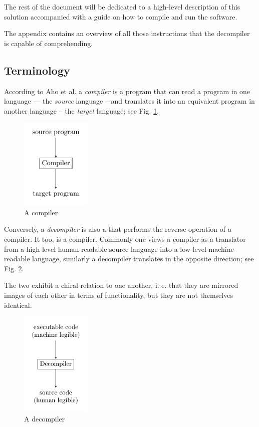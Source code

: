 \documentclass[a4paper]{article}
\begin{document}
The rest of the document will be dedicated to a high-level description
of this solution accompanied with a guide on how to compile and run
the software.

The appendix contains an overview of all those instructions that the
decompiler is capable of comprehending.
\subsection{Terminology}

According to Aho et al.  a \emph{compiler} is a program that
can read a program in one language --- the \emph{source} language --
and translates it into an equivalent program in another language --
the \emph{target} language; see Fig. \ref{fig:compiler}.

\begin{figure}[H]
  \centering
  \includegraphics[width=0.3\textwidth]{figures/compiler.png}
  \caption{A compiler}
  \label{fig:compiler}
\end{figure}

Conversely, a \emph{decompiler} is also a that performs the reverse
operation of a compiler. It too, is a compiler. Commonly one views a
compiler as a translator from a high-level human-readable source
language into a low-level machine-readable language, similarly a
decompiler translates in the opposite direction; see
Fig. \ref{fig:decompiler}. 

The two exhibit a chiral relation to one another, i. e. that they are
mirrored images of each other in terms of functionality, but they are
not themselves identical.

\begin{figure}[H]
  \centering
  \includegraphics[width=0.3\textwidth]{figures/decompiler.png}
  \caption{A decompiler}
  \label{fig:decompiler}
\end{figure}
\end{document}

